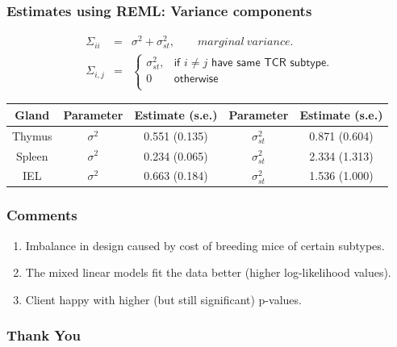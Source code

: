 \documentclass{beamer}
\begin{document}
\begin{frame}
\frametitle{Estimates using REML: Variance components}
\begin{eqnarray*}
\Sigma_{ii} & = & \sigma^2 + \sigma_{st}^2,	\qquad marginal~variance.\\
\Sigma_{i,j} & = & \begin{cases}
\sigma_{st}^2, & \textsf{if } i\neq j \textsf{ have same TCR subtype.}\\
0 & \textsf{otherwise} \\
                   \end{cases}
\end{eqnarray*}

\begin{center}
\begin{tabular}{|c| c  c | c   c|}\hline
Gland & Parameter & Estimate (s.e.) & Parameter & Estimate (s.e.) \\ \hline 
Thymus & $\sigma^2$ &  0.551 (0.135)& $\sigma_{st}^2$ & 0.871      (0.604) \\ \hline 
Spleen & $\sigma^2$ &  0.234 (0.065)& $\sigma_{st}^2$ &2.334      (1.313) \\ \hline
IEL & $\sigma^2$ &  0.663 (0.184) & $\sigma_{st}^2$ & 1.536 (1.000) \\ \hline
\end{tabular}
\end{center}
\end{frame}


\begin{frame}
\frametitle{Comments}
\begin{enumerate}
 \item Imbalance in design caused by cost of breeding mice of certain subtypes.
 \item The mixed linear models fit the data better (higher log-likelihood values).
 \item Client happy with higher (but still significant) p-values.
\end{enumerate}
\end{frame}

%
\begin{frame}
\frametitle{Thank You}

\end{frame}
\end{document}
